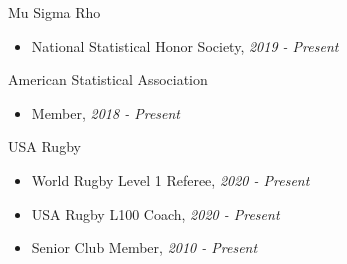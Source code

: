 
\Affiliation
{Mu Sigma Rho}
{\begin{itemize}
     \item National Statistical Honor Society, \emph{2019 - Present}
\end{itemize}}

\vspace*{0.05 in}

\Affiliation
{American Statistical Association}
{\begin{itemize}
    \item Member, \emph{2018 - Present}
\end{itemize}}

\vspace*{0.05 in}

\Affiliation
{USA Rugby}
{\begin{itemize}
    \item World Rugby Level 1 Referee, \emph{2020 - Present}
    \item USA Rugby L100 Coach, \emph{2020 - Present}
    \item Senior Club Member, \emph{2010 - Present}
\end{itemize}}